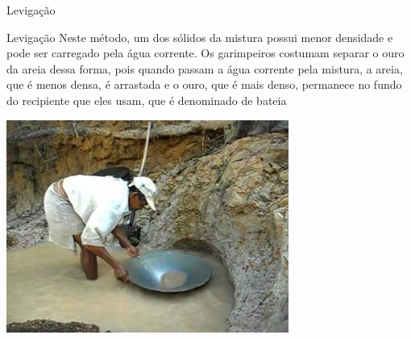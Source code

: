 \documentclass{beamer}
\begin{document}
\begin{frame}[label={sec:org2577478}]{Levigação}
\begin{block}{Levigação}
Neste método, um dos sólidos da mistura possui menor densidade e pode ser carregado pela água corrente. Os garimpeiros costumam separar o ouro da areia dessa forma, pois quando passam a água corrente pela mistura, a areia, que é menos densa, é arrastada e o ouro, que é mais denso, permanece no fundo do recipiente que eles usam, que é denominado de bateia

\begin{center}
\includegraphics[scale=0.5]{../img/levigacao.jpg}
\end{center}
\end{block}
\end{frame}
\end{document}
